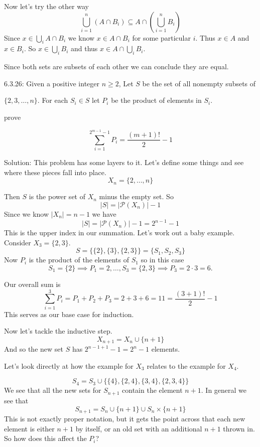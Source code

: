 \documentclass[16 pt]{amsart}
\theoremstyle{definition}
\theoremstyle{remark}
\numberwithin{equation}{section}
\begin{document}
Now let's try the other way
\[
\bigcup_{i=1}^{n} (A\cap B_i) \subseteq A\cap (\bigcup_{i=1}^{n} B_i)
\]
Since $x \in \bigcup_i A\cap B_i$ we know $x \in A\cap B_i$ for some particular $i$.  Thus $x\in A$ and $x\in B_i$.  So $x\in \bigcup_i B_i$ and thus $x\in A\cap \bigcup_i B_i$.

Since both sets are subsets of each other we can conclude they are equal.


\newpage

6.3.26: Given a positive integer $n\geq 2$, Let $S$ be the set of all nonempty subsets of

$\{2,3,\dots ,n\}$.  For each $S_i\in S$ let $P_i$ be the product of elements in $S_i$.

prove

\[
\sum_{i=1}^{2^{m-1}-1} P_i = \frac{(m+1)!}{2} -1
\]

\vspace{1in}

Solution:  This problem has some layers to it.  Let's define some things and see where these pieces fall into place.
\[
X_n = \{2,\dots,n\}
\]

Then $S$ is the power set of $X_n$ minus the empty set.  So
\[
|S| = |\mathcal{P}(X_n)| - 1
\]
Since we know $|X_n|=n-1$ we have
\[
|S| = |\mathcal{P}(X_n)| - 1 = 2^{n-1}-1
\]
This is the upper index in our summation.
Let's work out a baby example.  Consider $X_3 = \{2,3\}$.
\[
S = \{\{2\},\{3\},\{2,3\} \} = \{S_1,S_2,S_3\}
\]
Now $P_i$ is the product of the elements of $S_1$ so in this case
\[
S_1 = \{2\} \implies P_1 = 2, \dots , S_3=\{2,3\}\implies P_3 = 2\cdot 3=6.
\]

Our overall sum is
\[
\sum_{i=1}^3 P_i = P_1+P_2+P_3 = 2+3+6 = 11 = \frac{(3+1)!}{2}-1
\]
This serves as our base case for induction.

Now let's tackle the inductive step.
\[
X_{n+1} = X_n \cup \{n+1\}
\]
And so the new set $S$ has $2^{n-1+1}-1 = 2^n-1$ elements.

Let's look directly at how the example for $X_3$ relates to the example for $X_4$.

\[
S_4 = S_3 \cup \{\{4\},\{2,4\},\{3,4\},\{2,3,4\}\}
\]
We see that all the new sets for $S_{n+1}$ contain the element $n+1$.  In general we see that 
\[
S_{n+1} = S_n \cup \{n+1\} \cup S_n\times\{n+1\}
\]
This is not exactly proper notation, but it gets the point across that each new element is either $n+1$ by itself, or an old set with an additional $n+1$ thrown in.  So how does this affect the $P_i$?
\end{document}
